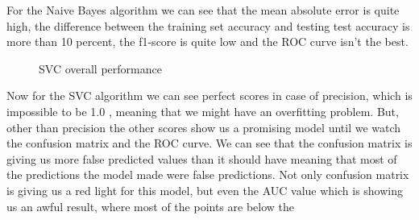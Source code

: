 For the Naive Bayes algorithm we can see that the mean absolute error is quite high, the
difference between the training set accuracy and testing test accuracy is more than 10 percent, the f1-score
is quite low and the ROC curve isn't the best.
\\[5pt]
\begin{figure}[H]
	\centering
	\hspace{5pt}
	\hspace{5pt}
	\caption{SVC overall performance}
	\label{fig:svc_perf}
\end{figure}
Now for the SVC algorithm we can see perfect scores in case of precision, which is impossible to be 1.0
, meaning that we might have an overfitting problem. But, other than precision the other scores show us a promising
model until we watch the confusion matrix and the ROC curve. We can see that the confusion matrix is giving us more false predicted
values than it should have meaning that most of the predictions the model made were false predictions. Not only confusion matrix is
giving us a red light for this model, but even the AUC value which is showing us an awful result, where most of the points are below the
